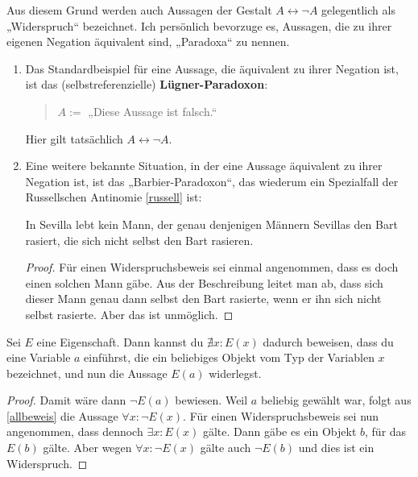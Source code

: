\begin{bsp}[*] \label{bsp:paradox}
    Aus diesem Grund werden auch Aussagen der Gestalt $A\leftrightarrow \neg A$ gelegentlich als „Widerspruch“ bezeichnet.  Ich persönlich bevorzuge es, Aussagen, die zu ihrer eigenen Negation äquivalent sind, „Paradoxa“ zu nennen.
    \begin{enumerate}
        \item Das Standardbeispiel für eine Aussage, die äquivalent zu ihrer Negation ist, ist das (selbstreferenzielle) \textbf{Lügner-Paradoxon}:
        \begin{quote}
            $A:=$ „Diese Aussage ist falsch.“
        \end{quote}
        Hier gilt tatsächlich $A\leftrightarrow \neg A$.
        \item Eine weitere bekannte Situation, in der eine Aussage äquivalent zu ihrer Negation ist, ist das „Barbier-Paradoxon“, das wiederum ein Spezialfall der Russellschen Antinomie \cref{russell} ist:
        \begin{satz}
            In Sevilla lebt kein Mann, der genau denjenigen Männern Sevillas den Bart rasiert, die sich nicht selbst den Bart rasieren.
        \end{satz}
        \begin{proof}
            Für einen Widerspruchsbeweis sei einmal angenommen, dass es doch einen solchen Mann gäbe. Aus der Beschreibung leitet man ab, dass sich dieser Mann genau dann selbst den Bart rasierte, wenn er ihn sich nicht selbst rasierte. Aber das ist unmöglich.
        \end{proof}
    \end{enumerate}
\end{bsp}

  
\begin{satz} \label{existenzwiderleg}
    Sei $E$ eine Eigenschaft. Dann kannst du $\nexists x: E(x)$ dadurch beweisen, dass du eine Variable $a$ einführst, die ein beliebiges Objekt vom Typ der Variablen $x$ bezeichnet, und nun die Aussage $E(a)$ widerlegst.
\end{satz}
\begin{proof}
    Damit wäre dann $\neg E(a)$ bewiesen. Weil $a$ beliebig gewählt war, folgt aus \cref{allbeweis} die Aussage $\forall x: \neg E(x)$. Für einen Widerspruchsbeweis sei nun angenommen, dass dennoch $\exists x: E(x)$ gälte. Dann gäbe es ein Objekt $b$, für das $E(b)$ gälte. Aber wegen $\forall x: \neg E(x)$ gälte auch $\neg E(b)$ und dies ist ein Widerspruch.
\end{proof}


